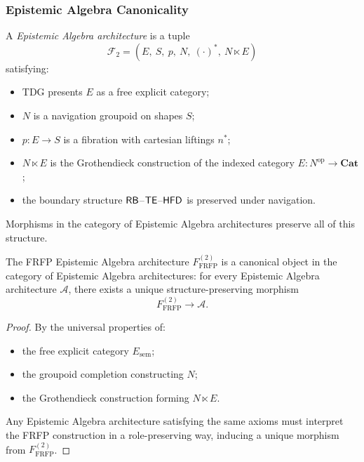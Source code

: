 \subsubsection{Epistemic Algebra Canonicality}

\begin{definition}
A \emph{Epistemic Algebra architecture} is a tuple
\[
\mathcal{F}_2
 =
(E,\ S,\ p,\ N,\ (\cdot)^\ast,\ N \ltimes E)
\]
satisfying:
\begin{itemize}
  \item TDG presents \(E\) as a free explicit category;
  \item \(N\) is a navigation groupoid on shapes \(S\);
  \item \(p : E \to S\) is a fibration with cartesian liftings \(n^\ast\);
  \item \(N \ltimes E\) is the Grothendieck construction of the indexed
        category \(E : N^{\mathrm{op}} \to \mathbf{Cat}\);
  \item the boundary structure \(\mathsf{RB}\)--\(\mathsf{TE}\)--\(\mathsf{HFD}\) is preserved
        under navigation.
\end{itemize}
Morphisms in the category of Epistemic Algebra architectures preserve all of this
structure.
\end{definition}

\begin{theorem}
\label{thm:phase2-canonicality}
The FRFP Epistemic Algebra architecture
\(F^{(2)}_{\mathrm{FRFP}}\) is a canonical object in the category of
Epistemic Algebra architectures: for every Epistemic Algebra architecture \(\mathcal{A}\),
there exists a unique structure-preserving morphism
\[
F^{(2)}_{\mathrm{FRFP}} \to \mathcal{A}.
\]
\end{theorem}

\begin{proof}
By the universal properties of:
\begin{itemize}
  \item the free explicit category \(E_{\mathrm{sem}}\);
  \item the groupoid completion constructing \(N\);
  \item the Grothendieck construction forming \(N \ltimes E\).
\end{itemize}
Any Epistemic Algebra architecture satisfying the same axioms must interpret the
FRFP construction in a role-preserving way, inducing a unique morphism
from \(F^{(2)}_{\mathrm{FRFP}}\).
\end{proof}

